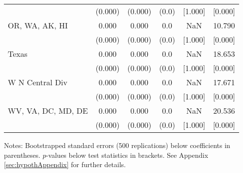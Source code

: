 \begin{landscape}
\begin{table}[ht]
{\begin{threeparttable}
\begin{tabular}{lccccc}
 & (0.000) & (0.000) & (0.0) & [1.000] & [0.000] \\ 
OR, WA, AK, HI & 0.000 & 0.000 & 0.0 & NaN & 10.790 \\ 
 & (0.000) & (0.000) & (0.0) & [1.000] & [0.000] \\ 
Texas & 0.000 & 0.000 & 0.0 & NaN & 18.653 \\ 
 & (0.000) & (0.000) & (0.0) & [1.000] & [0.000] \\ 
W N Central Div & 0.000 & 0.000 & 0.0 & NaN & 17.671 \\ 
 & (0.000) & (0.000) & (0.0) & [1.000] & [0.000] \\ 
WV, VA, DC, MD, DE & 0.000 & 0.000 & 0.0 & NaN & 20.536 \\ 
 & (0.000) & (0.000) & (0.0) & [1.000] & [0.000] \\ 
\bottomrule
\end{tabular}
{\footnotesize {\raggedright Notes: Bootstrapped standard errors (500 replications) below coefficients in parentheses. $p$-values below test statistics in brackets. See Appendix \ref{sec:hypothAppendix} for further details.}}
\end{threeparttable}
}
\end{table}
\end{landscape}
